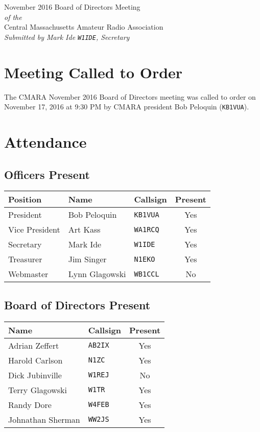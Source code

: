 \documentclass[10pt,letterpaper]{article}
\begin{document}
\begin{center}
{\huge November 2016 Board of Directors Meeting}\\
\emph{of the}\\
{\Large Central Massachusetts Amateur Radio Association}\\
\emph{Submitted by Mark Ide \texttt{W1IDE}, Secretary}
\end{center}

\section{Meeting Called to Order}
The CMARA November 2016 Board of Directors meeting was called to order on November 17, 2016 at 9:30 PM by CMARA president Bob Peloquin (\texttt{KB1VUA}).

\section{Attendance}

\subsection{Officers Present}

\begin{tabular}{|l|l|l|c|}
  \hline
  \textbf{Position} & \textbf{Name}  & \textbf{Callsign} & \textbf{Present} \\ \hline
  President         & Bob Peloquin   & \texttt{KB1VUA}   & Yes \\
  Vice President    & Art Kass       & \texttt{WA1RCQ}   & Yes \\
  Secretary         & Mark Ide       & \texttt{W1IDE}    & Yes \\
  Treasurer         & Jim Singer     & \texttt{N1EKO}    & Yes  \\
  Webmaster         & Lynn Glagowski & \texttt{WB1CCL}   & No  \\
  \hline
\end{tabular}

\subsection{Board of Directors Present}

\begin{tabular}{|l|l|c|}
  \hline
  \textbf{Name}     & \textbf{Callsign} & \textbf{Present} \\ \hline
  Adrian Zeffert    & \texttt{AB2IX}    & Yes \\
  Harold Carlson    & \texttt{N1ZC}     & Yes  \\
  Dick Jubinville   & \texttt{W1REJ}    & No \\
  Terry Glagowski   & \texttt{W1TR}     & Yes \\
  Randy Dore        & \texttt{W4FEB}    & Yes \\
  Johnathan Sherman & \texttt{WW2JS}    & Yes \\
  \hline
\end{tabular}
\end{document}
